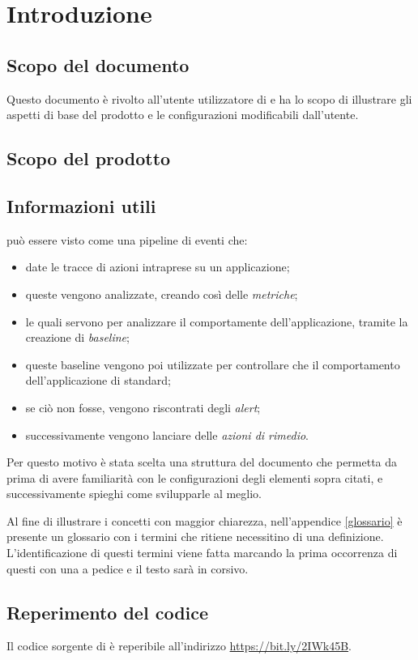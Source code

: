 \section{Introduzione} \label{intro}

    \subsection{Scopo del documento}

        Questo documento è rivolto all’utente utilizzatore di \ProjectName{} e ha lo scopo di illustrare gli aspetti di base del prodotto e le configurazioni modificabili dall'utente.

    \subsection{Scopo del prodotto}

        \ScopoProdotto{}


    \subsection{Informazioni utili}
		
		\ProjectName{} può essere visto come una pipeline di eventi che:
		\begin{itemize}
			\item date le tracce di azioni intraprese su un applicazione;
			\item queste vengono analizzate, creando così delle \textit{metriche};
			\item le quali servono per analizzare il comportamente dell'applicazione, tramite la creazione di \textit{baseline};
			\item queste baseline vengono poi utilizzate per controllare che il comportamento dell'applicazione di standard;
			\item se ciò non fosse, vengono riscontrati degli \textit{alert};
			\item successivamente vengono lanciare delle \textit{azioni di rimedio}.
		\end{itemize}		

		Per questo motivo è stata scelta una struttura del documento che permetta da prima di avere familiarità con le configurazioni degli elementi sopra citati, e successivamente spieghi come svilupparle al meglio.

		Al fine di illustrare i concetti con maggior chiarezza, nell'appendice \ref{glossario} è presente un glossario
		con i termini che \GroupName{} ritiene necessitino di una definizione. L'identificazione di questi termini
		viene fatta marcando la prima occorrenza di questi con una \glossaryItem{} a pedice e il testo sarà in corsivo.
		
		\subsection{Reperimento del codice} \label{reperimentocodice}

    	Il codice sorgente di \ProjectName{} è reperibile all'indirizzo \url{https://bit.ly/2IWk45B}.
